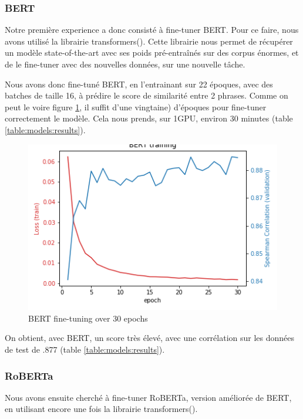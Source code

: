 \documentclass[11pt,a4paper, french]{article}
\begin{document}
\subsubsection{BERT}

Notre première experience a donc consisté à fine-tuner BERT. Pour ce faire, nous avons utilisé la librairie transformers(\cite{huggingface}). Cette librairie nous permet de récupérer un modèle state-of-the-art avec ses poids pré-entraînés sur des corpus énormes, et de le fine-tuner avec des nouvelles données, sur une nouvelle tâche.

Nous avons donc fine-tuné BERT, en l'entrainant sur 22 époques, avec des batches de taille 16, à prédire le score de similarité entre 2 phrases. Comme on peut le voire figure \ref{fig:BERT:finetunning}, il suffit d'une vingtaine) d'époques pour fine-tuner correctement le modèle. Cela nous prends, sur 1GPU, environ 30 minutes (table \ref{table:models:results}).

\begin{figure}
  \includegraphics[width=\linewidth]{resources/BERT-training.png}
  \caption{BERT fine-tuning over 30 epochs}
  \label{fig:BERT:finetunning}
\end{figure}

On obtient, avec BERT, un score très élevé, avec une corrélation sur les données de test de .877 (table \ref{table:models:results}).

%
\subsubsection{RoBERTa}

Nous avons ensuite cherché à fine-tuner RoBERTa, version améliorée de BERT, en utilisant encore une fois la librairie transformers(\cite{huggingface}).
\end{document}
